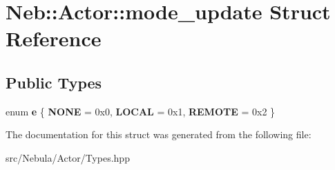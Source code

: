 \hypertarget{structNeb_1_1Actor_1_1mode__update}{\section{\-Neb\-:\-:\-Actor\-:\-:mode\-\_\-update \-Struct \-Reference}
\label{structNeb_1_1Actor_1_1mode__update}
}
\subsection*{\-Public \-Types}
\begin{DoxyCompactItemize}
\item 
enum {\bfseries e} \{ {\bfseries \-N\-O\-N\-E} =  0x0, 
{\bfseries \-L\-O\-C\-A\-L} =  0x1, 
{\bfseries \-R\-E\-M\-O\-T\-E} =  0x2
 \}
\end{DoxyCompactItemize}


\-The documentation for this struct was generated from the following file\-:\begin{DoxyCompactItemize}
\item 
src/\-Nebula/\-Actor/\-Types.\-hpp\end{DoxyCompactItemize}

